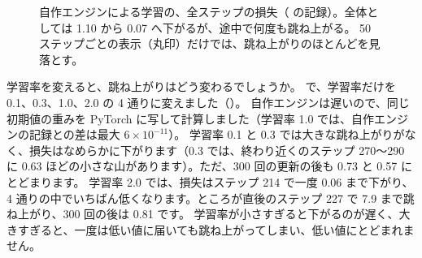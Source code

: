 \begin{figure}[tbp]
\centering
{}
\caption{自作エンジンによる学習の、全ステップの損失（ の記録）。全体としては 1.10 から 0.07 へ下がるが、途中で何度も跳ね上がる。
50 ステップごとの表示（丸印）だけでは、跳ね上がりのほとんどを見落とす。}
\label{fig:nn-scratch-loss}
\end{figure}

学習率を変えると、跳ね上がりはどう変わるでしょうか。
 で、学習率だけを 0.1、0.3、1.0、2.0 の 4 通りに変えました（）。
自作エンジンは遅いので、同じ初期値の重みを PyTorch に写して計算しました（学習率 1.0 では、自作エンジンの記録との差は最大 $6\times10^{-11}$）。
学習率 0.1 と 0.3 では大きな跳ね上がりがなく、損失はなめらかに下がります（0.3 では、終わり近くのステップ 270〜290 に 0.63 ほどの小さな山があります）。ただ、300 回の更新の後も 0.73 と 0.57 にとどまります。
学習率 2.0 では、損失はステップ 214 で一度 0.06 まで下がり、4 通りの中でいちばん低くなります。ところが直後のステップ 227 で 7.9 まで跳ね上がり、300 回の後は 0.81 です。
学習率が小さすぎると下がるのが遅く、大きすぎると、一度は低い値に届いても跳ね上がってしまい、低い値にとどまれません。

